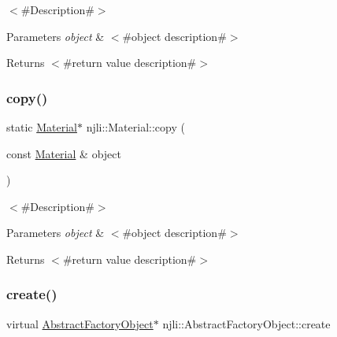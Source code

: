 $<$\#\+Description\#$>$


\begin{DoxyParams}{Parameters}
{\em object} & $<$\#object description\#$>$\\
\hline
\end{DoxyParams}
\begin{DoxyReturn}{Returns}
$<$\#return value description\#$>$ 
\end{DoxyReturn}
\mbox{\label{classnjli_1_1_material_a3296d34a077b014a02001bbf876eab80}} 
\subsubsection{\texorpdfstring{copy()}{copy()}}
{\footnotesize\ttfamily static \mbox{\hyperlink{classnjli_1_1_material}{Material}}$\ast$ njli\+::\+Material\+::copy (\begin{DoxyParamCaption}\item[{const \mbox{\hyperlink{classnjli_1_1_material}{Material}} \&}]{object }\end{DoxyParamCaption})\hspace{0.3cm}{\ttfamily [static]}}

$<$\#\+Description\#$>$


\begin{DoxyParams}{Parameters}
{\em object} & $<$\#object description\#$>$\\
\hline
\end{DoxyParams}
\begin{DoxyReturn}{Returns}
$<$\#return value description\#$>$ 
\end{DoxyReturn}
\mbox{\label{classnjli_1_1_material_a83a8876ae63b92804004cf3febe76573}} 
\subsubsection{\texorpdfstring{create()}{create()}\hspace{0.1cm}{\footnotesize\ttfamily [1/3]}}
{\footnotesize\ttfamily virtual \mbox{\hyperlink{classnjli_1_1_abstract_factory_object}{Abstract\+Factory\+Object}}$\ast$ njli\+::\+Abstract\+Factory\+Object\+::create}

